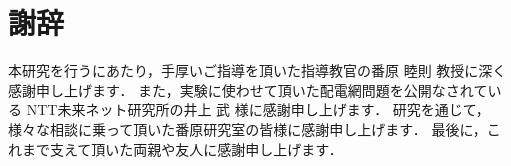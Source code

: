 \chapter*{謝辞}

本研究を行うにあたり，手厚いご指導を頂いた指導教官の番原 睦則 教授に深く感謝申し上げます．
また，実験に使わせて頂いた配電網問題を公開なされている
NTT未来ネット研究所の井上 武 様に感謝申し上げます．
研究を通じて，様々な相談に乗って頂いた番原研究室の皆様に感謝申し上げます．
最後に，これまで支えて頂いた両親や友人に感謝申し上げます．

